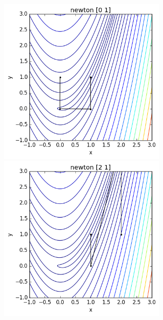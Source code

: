\documentclass[11pt]{article}
\begin{document}
\begin{figure}[h!]
  \includegraphics[width=3.3in]{rosenbrock-newton0.png}
  \includegraphics[width=3.3in]{rosenbrock-newton2.png}
\end{figure}

\pagebreak
\end{document}
